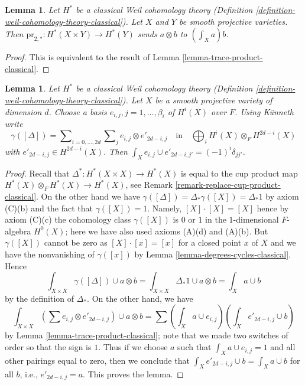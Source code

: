 \documentclass{stacks-project}
\theoremstyle{plain}
\newtheorem{lemma}[subsection]{Lemma}
\theoremstyle{definition}
\theoremstyle{remark}
\numberwithin{equation}{subsection}
\begin{document}
\begin{lemma}
\label{lemma-pr2star-classical}
Let $H^*$ be a classical Weil cohomology theory
(Definition \ref{definition-weil-cohomology-theory-classical}).
Let $X$ and $Y$ be smooth projective varieties.
Then $\text{pr}_{2, *} : H^*(X \times Y) \to H^*(Y)$
sends $a \otimes b$ to $(\int_X a) b$.
\end{lemma}

\begin{proof}
This is equivalent to the result of Lemma \ref{lemma-trace-product-classical}.
\end{proof}

\begin{lemma}
\label{lemma-class-diagonal-classical}
Let $H^*$ be a classical Weil cohomology theory
(Definition \ref{definition-weil-cohomology-theory-classical}).
Let $X$ be a smooth projective variety of dimension $d$.
Choose a basis $e_{i, j}, j = 1, \ldots, \beta_i$ of $H^i(X)$ over $F$.
Using K\"unneth write
$$
\gamma([\Delta]) =
\sum\nolimits_{i = 0, \ldots, 2d}
\sum\nolimits_j e_{i, j} \otimes e'_{2d - i , j}
\quad\text{in}\quad
\bigoplus\nolimits_i H^i(X) \otimes_F H^{2d - i}(X)
$$
with $e'_{2d - i, j} \in H^{2d - i}(X)$.
Then $\int_X e_{i, j} \cup e'_{2d - i, j'} = (-1)^i\delta_{jj'}$.
\end{lemma}

\begin{proof}
Recall that $\Delta^* : H^*(X \times X) \to H^*(X)$ is equal to the
cup product map $H^*(X) \otimes_F H^*(X) \to H^*(X)$, see
Remark \ref{remark-replace-cup-product-classical}. On the other hand we have
$\gamma([\Delta]) = \Delta_*\gamma([X]) = \Delta_*1$ by
axiom (C)(b) and the fact that $\gamma([X]) = 1$. Namely,
$[X] \cdot [X] = [X]$ hence by axiom (C)(c) the cohomology class
$\gamma([X])$ is $0$ or $1$ in the $1$-dimensional $F$-algebra $H^0(X)$;
here we have also used axioms (A)(d) and (A)(b).
But $\gamma([X])$ cannot be zero as $[X] \cdot [x] = [x]$
for a closed point $x$ of $X$ and we have the nonvanishing
of $\gamma([x])$ by Lemma \ref{lemma-degrees-cycles-classical}.
Hence
$$
\int_{X \times X} \gamma([\Delta]) \cup a \otimes b =
\int_{X \times X} \Delta_*1 \cup a \otimes b =
\int_X a \cup b
$$
by the definition of $\Delta_*$. On the other hand, we have
$$
\int_{X \times X} (\sum e_{i, j} \otimes e'_{2d -i , j}) \cup a \otimes b =
\sum (\int_X a \cup e_{i, j})(\int_X e'_{2d - i, j} \cup b)
$$
by Lemma \ref{lemma-trace-product-classical}; note that we made
two switches of order so that the sign is $1$.
Thus if we choose $a$ such that $\int_X a \cup e_{i, j} = 1$
and all other pairings equal to zero, then we conclude that
$\int_X e'_{2d - i, j} \cup b = \int_X a \cup b$ for all $b$, i.e.,
$e'_{2d - i, j} = a$. This proves the lemma.
\end{proof}
\end{document}
